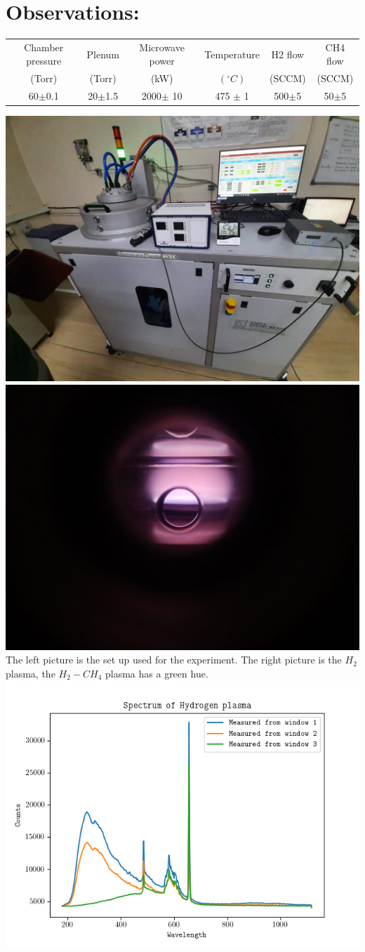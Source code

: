 \documentclass[]{report}[12 pt]
\begin{document}
	\section*{Observations:}
	\begin{center}
			\begin{tabular}{|c|c|c|c|c|c|}
			\hline
			Chamber pressure& Plenum & Microwave power & Temperature & H2 flow& CH4 flow\\
			(Torr)& (Torr)  & (kW)&$(^{\circ}C)$&(SCCM)&(SCCM)\\
			\hline
			60$\pm$0.1&20$\pm$1.5& 2000$\pm$ 10&475 $\pm$ 1&500$\pm$5 & 50$\pm$5\\
			\hline
		\end{tabular}
		\includegraphics[width=7 cm]{plasma.jpeg}
		\includegraphics[width=7 cm]{plasma2.jpeg}\\
		The left picture is the set up used for the experiment. The right picture is the $H_2$ plasma, the $H_2-CH_4$ plasma has a green hue.\\
		\includegraphics[width=9 cm,height=7 cm]{h2.png}

\end{center}
\end{document}
